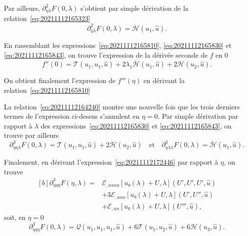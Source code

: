 \documentclass[12pt, final]{amsart}
\begin{document}
Par ailleurs, \(\partial_{\eta\lambda}^2F(0, \lambda)\) s'obtient par simple
dérivation de la relation~\eqref{eq:20211112165323}
\begin{equation}
  \label{eq:20211112165843}
  \partial_{\eta\lambda}^2F(0, \lambda)=\dot{\mathcal H}(u_1, \hat{u}).
\end{equation}

En rassemblant les expressions~\eqref{eq:20211112165810},
\eqref{eq:20211112165830} et \eqref{eq:20211112165843}, on trouve l'expression
de la dérivée seconde de \(f\) en 0
\begin{equation}
  \label{eq:20211112182333}
  f''(0)=\mathcal T(u_1, u_1, \hat{u})
  +2\lambda_1\dot{\mathcal H}(u_1, \hat{u})
  +2\mathcal H(u_2, \hat{u}).
\end{equation}

On obtient finalement l'expression de \(f'''(\eta)\) en dérivant la
relation~\eqref{eq:20211112165810}

La relation~\eqref{eq:20211112164240} montre une nouvelle fois que les trois
derniers termes de l'expression ci-dessus s'annulent en \(\eta=0\). Par simple
dérivation par rapport à \(\lambda\) des expressions~\eqref{eq:20211112165830}
et \eqref{eq:20211112165843}, on trouve par ailleurs
\begin{equation}
  \label{eq:20211112173247}
  \partial_{\eta\eta\lambda}^3F(0, \lambda)
  =\dot{\mathcal T}(u_1, u_1, \hat{u})+2\dot{\mathcal H}(u_2, \hat{u})
  \quad\text{et}\quad
  \partial_{\eta\lambda\lambda}^3F(0, \lambda)
  =\ddot{\mathcal H}(u_1, \hat{u}).
\end{equation}

Finalement, en dérivant l'expression~\eqref{eq:20211112172446} par rapport à
\(\eta\), on trouve
\begin{equation}
  \begin{aligned}[b]
    \partial_{\eta\eta\eta}^3F(\eta, \lambda)={}&
    \mathcal E_{,uuuu}[u₀(\lambda)+U, \lambda](U', U', U', \hat{u})\\
    &+3\mathcal E_{,uuu}[u₀(\lambda)+U, \lambda](U', U'', \hat{u})\\
    &+\mathcal E_{,uu}[u₀(\lambda)+U, \lambda](U''', \hat{u}),
  \end{aligned}
\end{equation}
soit, en \(\eta=0\)
\begin{equation}
  \label{eq:20211112173300}
  \partial_{\eta\eta\eta}^3F(0, \lambda)=
  \mathcal Q(u_1, u_1, u_1, \hat{u})
  +6\mathcal T(u_1, u_2, \hat{u})
  +6\mathcal H(u_3, \hat{u}).
\end{equation}
\end{document}
